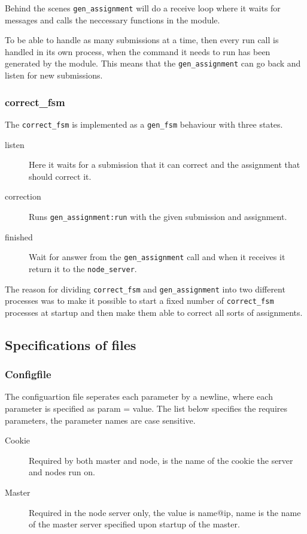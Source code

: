 Behind the scenes \texttt{gen\_assignment} will do a receive loop where it waits
for messages and calls the neccessary functions in the module.

To be able to handle as many submissions at a time, then every run call is
handled in its own process, when the command it needs to run has been generated
by the module. This means that the \texttt{gen\_assignment} can go back and
listen for new submissions.

\subsubsection{correct\_fsm}
The \texttt{correct\_fsm} is implemented as a \texttt{gen\_fsm} behaviour with
three states.
\begin{description}
    \item[listen] Here it waits for a submission that it can correct and the
    assignment that should correct it.
    \item[correction] Runs \texttt{gen\_assignment:run} with the given
    submission and assignment.
    \item[finished] Wait for answer from the \texttt{gen\_assignment} call and
    when it receives it return it to the \texttt{node\_server}.
\end{description}

The reason for dividing \texttt{correct\_fsm} and \texttt{gen\_assignment} into
two different processes was to make it possible to start a fixed number of
\texttt{correct\_fsm} processes at startup and then make them able to correct
all sorts of assignments.
\subsection{Specifications of files}
\subsubsection{Configfile}
\label{sec:config}
The configuartion file seperates each parameter by a newline, where each parameter is specified as param = value.
The list below specifies the requires parameters, the parameter names are case sensitive.
\begin{description}
    \item[Cookie] Required by both master and node, is the name of the cookie the server and nodes run on.
    \item[Master] Required in the node server only, the value is name@ip, name is the name of the master server specified upon startup of the master.
\end{description}
